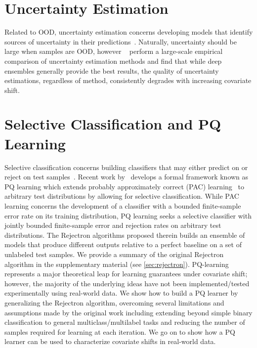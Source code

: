 \section{Uncertainty Estimation}\label{sec:uncertainty-estimation}
Related to OOD, uncertainty estimation concerns developing models that identify sources of uncertainty in their predictions~\citep{ensemble, trustuncert}.
Naturally, uncertainty should be large when samples are OOD, however ~\citep{trustuncert} perform a large-scale empirical comparison of uncertainty estimation methods and find that while deep ensembles generally provide the best results, the quality of uncertainty estimations, regardless of method, consistently degrades with increasing covariate shift.


\section{Selective Classification and PQ Learning}\label{sec:selective-classification-and-pq-learning}
Selective classification concerns building classifiers that may either predict on or reject on test samples~\citep{selectivenet}.
Recent work by~\citep{pqlearn} develops a formal framework known as PQ learning which extends probably approximately correct (PAC) learning~\citep{Haussler90probablyapproximately} to arbitrary test distributions by allowing for selective classification.
While PAC learning concerns the development of a classifier with a bounded finite-sample error rate on its training distribution, PQ learning seeks a selective classifier with jointly bounded finite-sample error and rejection rates on arbitrary test distributions.
The Rejectron algorithms proposed therein builds an ensemble of models that produce different outputs relative to a perfect baseline on a set of unlabeled test samples.
We provide a summary of the original Rejectron algorithm in the supplementary material (see \autoref{sec:rejectron}).
PQ-learning represents a major theoretical leap for learning guarantees under covariate shift;
however, the majority of the underlying ideas have not been implemented/tested experimentally using real-world data.
We show how to build a PQ learner by generalizing the Rejectron algorithm, overcoming several limitations and assumptions made by the original work including extending beyond simple binary classification to general multiclass/multilabel tasks and reducing the number of samples required for learning at each iteration.
We go on to show how a PQ learner can be used to characterize covariate shifts in real-world data.
